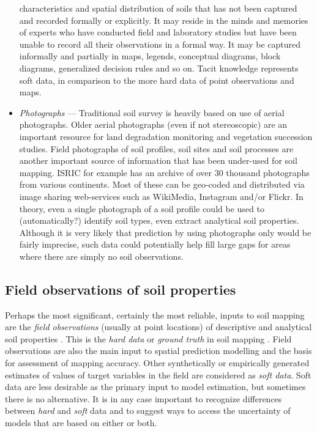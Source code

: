 \documentclass[11pt]{krantz}
\theoremstyle{definition}
\theoremstyle{definition}
\theoremstyle{definition}
\theoremstyle{remark}
\begin{document}
\begin{itemize}
  characteristics and spatial distribution of soils that has not been
  captured and recorded formally or explicitly. It may reside in the
  minds and memories of experts who have conducted field and laboratory
  studies but have been unable to record all their observations in a
  formal way. It may be captured informally and partially in maps,
  legends, conceptual diagrams, block diagrams, generalized decision
  rules and so on. Tacit knowledge represents soft data, in comparison
  to the more hard data of point observations and maps.
\item
  \emph{Photographs} --- Traditional soil survey is heavily based on use
  of aerial photographs. Older aerial photographs (even if not
  stereoscopic) are an important resource for land degradation
  monitoring and vegetation succession studies. Field photographs of
  soil profiles, soil sites and soil processes are another important
  source of information that has been under-used for soil mapping. ISRIC
  for example has an archive of over 30 thousand photographs from
  various continents. Most of these can be geo-coded and distributed via
  image sharing web-services such as WikiMedia, Instagram and/or Flickr.
  In theory, even a single photograph of a soil profile could be used to
  (automatically?) identify soil types, even extract analytical soil
  properties. Although it is very likely that prediction by using
  photographs only would be fairly imprecise, such data could
  potentially help fill large gaps for areas where there are simply no
  soil observations.
\end{itemize}

\hypertarget{field-observations}{%
\subsection{Field observations of soil
properties}\label{field-observations}}

Perhaps the most significant, certainly the most reliable, inputs to
soil mapping are the \emph{field observations} (usually at point
locations) of descriptive and analytical soil properties
\citep{SSDS1993, Schoeneberger1998}. This is the \emph{hard data} or
\emph{ground truth} in soil mapping \citep{Rossiter2001}. Field
observations are also the main input to spatial prediction modelling and
the basis for assessment of mapping accuracy. Other synthetically or
empirically generated estimates of values of target variables in the
field are considered as \emph{soft data}. Soft data are less desirable
as the primary input to model estimation, but sometimes there is no
alternative. It is in any case important to recognize differences
between \emph{hard} and \emph{soft} data and to suggest ways to access
the uncertainty of models that are based on either or both.
\end{document}
